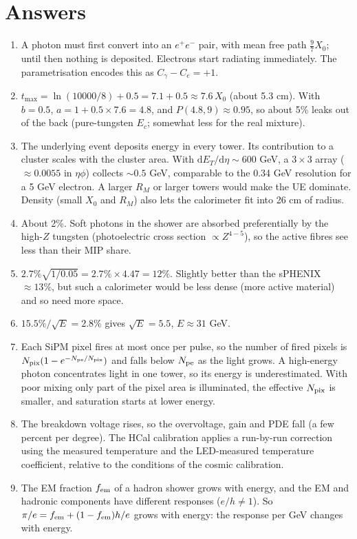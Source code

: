 \documentclass[11pt,letterpaper]{article}
\begin{document}
\section{Answers}
\begin{enumerate}
\item A photon must first convert into an $e^+e^-$ pair, with mean free path $\tfrac97X_0$; until then nothing is deposited. Electrons start radiating immediately. The parametrisation encodes this as $C_\gamma-C_e=+1$.
\item $t_{\max}=\ln(10000/8)+0.5=7.1+0.5\approx7.6\,X_0$ (about 5.3 cm). With $b=0.5$, $a=1+0.5\times7.6=4.8$, and $P(4.8,9)\approx0.95$, so about 5\% leaks out of the back (pure-tungsten $E_c$; somewhat less for the real mixture).
\item The underlying event deposits energy in every tower. Its contribution to a cluster scales with the cluster area. With $\mathrm{d}E_T/\mathrm{d}\eta\sim600$ GeV, a $3\times3$ array ($\approx0.0055$ in $\eta\phi$) collects $\sim0.5$ GeV, comparable to the 0.34 GeV resolution for a 5 GeV electron. A larger $R_M$ or larger towers would make the UE dominate. Density (small $X_0$ and $R_M$) also lets the calorimeter fit into 26 cm of radius.
\item About 2\%. Soft photons in the shower are absorbed preferentially by the high-$Z$ tungsten (photoelectric cross section $\propto Z^{4-5}$), so the active fibres see less than their MIP share.
\item $2.7\%\sqrt{1/0.05}=2.7\%\times4.47=12\%$. Slightly better than the sPHENIX $\approx13\%$, but such a calorimeter would be less dense (more active material) and so need more space.
\item $15.5\%/\sqrt{E}=2.8\%$ gives $\sqrt{E}=5.5$, $E\approx31$ GeV.
\item Each SiPM pixel fires at most once per pulse, so the number of fired pixels is $N_{\rm pix}(1-e^{-N_{\rm pe}/N_{\rm pix}})$ and falls below $N_{\rm pe}$ as the light grows. A high-energy photon concentrates light in one tower, so its energy is underestimated. With poor mixing only part of the pixel area is illuminated, the effective $N_{\rm pix}$ is smaller, and saturation starts at lower energy.
\item The breakdown voltage rises, so the overvoltage, gain and PDE fall (a few percent per degree). The HCal calibration applies a run-by-run correction using the measured temperature and the LED-measured temperature coefficient, relative to the conditions of the cosmic calibration.
\item The EM fraction $f_{\rm em}$ of a hadron shower grows with energy, and the EM and hadronic components have different responses ($e/h\neq1$). So $\pi/e=f_{\rm em}+(1-f_{\rm em})h/e$ grows with energy: the response per GeV changes with energy.

\end{enumerate}
\end{document}
